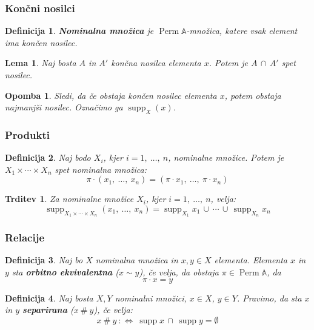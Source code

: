 \documentclass{beamer}
\DeclareMathOperator{\Perm}{Perm}
\DeclareMathOperator{\supp}{supp}
\newtheorem{trditev}{Trditev}
\newtheorem{lema}{Lema}
\newtheorem{definicija}{Definicija}
\newtheorem{opomba}{Opomba}
\begin{document}
\begin{frame}[fragile]
\frametitle{Končni nosilci}


\begin{definicija}
    \textbf{Nominalna množica} je \(\Perm\mathds{A}\)-množica, katere vsak element ima končen nosilec.
\end{definicija}
\pause
\begin{lema}
    Naj bosta \(A\) in \(A'\) končna nosilca elementa \(x\). Potem je \(A\, \cap\, A'\) spet nosilec.
\end{lema}

\begin{opomba}
    Sledi, da če obstaja končen nosilec elementa \(x\), potem obstaja najmanjši nosilec. Označimo ga \(\supp_X(x)\).
\end{opomba}

\end{frame}


\begin{frame}[fragile]
\frametitle{Produkti}

\begin{definicija}
    Naj bodo \(X_i\), kjer \(i = 1,\ \ldots,\ n\), nominalne množice. Potem je \(X_1 \times \cdots \times X_n\) spet nominalna množica:
    \[
        \pi \cdot (x_1,\ \ldots,\ x_n) = (\pi \cdot x_1,\ \ldots,\ \pi \cdot x_n)
    \]
\end{definicija}
\pause
\begin{trditev}
    Za nominalne množice \(X_i\), kjer \(i = 1,\ \ldots,\ n\), velja:
    \[
        \supp_{X_1 \times \cdots \times X_n}(x_1,\ \ldots,\ x_n) = \supp_{X_1} x_1\, \cup\, \cdots\, \cup\, \supp_{X_n} x_n
    \]
\end{trditev}


\end{frame}

\begin{frame}[fragile]
\frametitle{Relacije}
\begin{definicija}
    Naj bo \(X\) nominalna množica in \(x, y \in X\) elementa.
    Elementa \(x\) in \(y\) sta \textbf{orbitno ekvivalentna} (\(x \sim y\)), če velja, da obstaja \(\pi \in \Perm \mathds{A}\), da
    \[
        \pi \cdot x = y
    \]
    
\end{definicija}
\pause
\begin{definicija}
    Naj bosta \(X, Y\) nominalni množici, \(x \in X\), \(y \in Y\). Pravimo, da sta \(x\) in \(y\) \textbf{separirana} (\(x \ \#\ y\)), če velja:
    \[
        x \ \#\ y\ :\Longleftrightarrow\ \supp x\, \cap\, \supp y = \emptyset
    \]
\end{definicija}
    
\end{frame}
\end{document}
